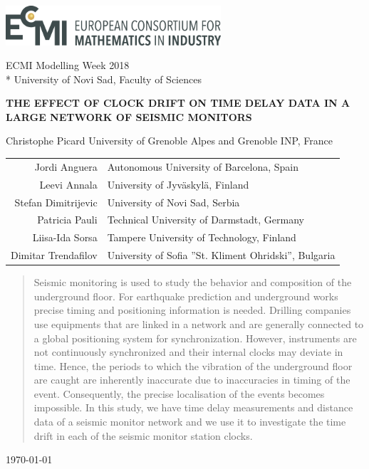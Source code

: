 \documentclass[12pt, sumlimits, intlimits]{article}
\begin{document}
\includegraphics[width=8cm]{../figures/ecmi-logo.png}

ECMI Modelling Week 2018 \\*
University of Novi Sad, Faculty of Sciences

\begin{center}
\vspace{2.0cm}
{\Large{\textbf{\MakeUppercase{The effect of clock drift on time delay data in a large network of seismic monitors}}}}


Christophe Picard University of Grenoble Alpes and Grenoble INP, France

\begin{tabular}{rl}
Jordi Anguera & Autonomous University of Barcelona, Spain \\
Leevi Annala & University of Jyväskylä, Finland \\
Stefan Dimitrijevic & University of Novi Sad, Serbia \\
Patricia Pauli & Technical University of Darmstadt, Germany \\
Liisa-Ida Sorsa & Tampere University of Technology, Finland \\ 
Dimitar Trendafilov & University of Sofia ''St. Kliment Ohridski'', Bulgaria

\end{tabular}

\begin{abstract}
	Seismic monitoring is used to study the behavior and composition of the underground floor. For earthquake prediction and underground works precise timing and positioning information is needed. Drilling companies use equipments that are linked in a network and are generally connected to a global positioning system for synchronization. However, instruments are not continuously  synchronized and their internal clocks may deviate in time. Hence, the periods to which the vibration of the underground floor are caught are inherently inaccurate due to inaccuracies in timing of the event. Consequently, the precise localisation of the events becomes impossible. In this study, we have time delay measurements and distance data of a seismic monitor network and we use it to investigate the time drift in each of the seismic monitor station clocks.
	
\end{abstract}


\today

\end{center}
\end{document}
